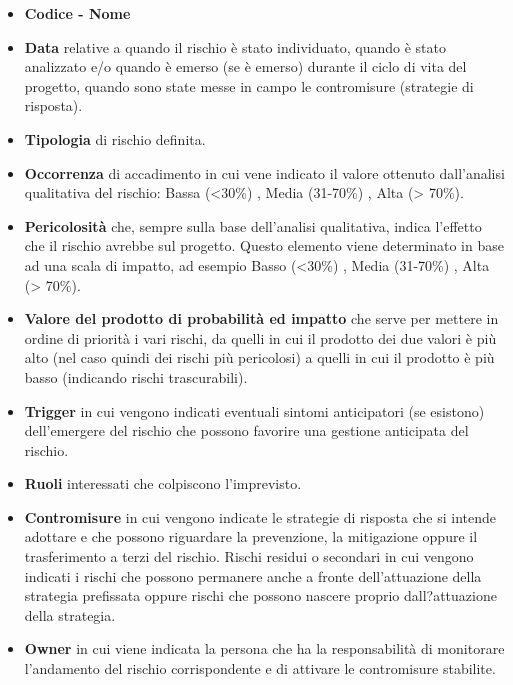 \documentclass[12pt,a4paper,titlepage]{article}
\begin{document}
		\begin{itemize}	
			\item \textbf{Codice - Nome}
			\item \textbf{Data} relative a quando il rischio è stato individuato, quando è stato analizzato e/o quando è emerso (se è emerso) durante il ciclo di vita del progetto, quando sono state messe in campo le contromisure (strategie di risposta).
			\item \textbf{Tipologia} di rischio definita.
			\item \textbf{Occorrenza} di accadimento in cui vene indicato il valore ottenuto dall'analisi qualitativa del rischio: Bassa (<30\%) , Media (31-70\%) , Alta (> 70\%).
			\item \textbf{Pericolosità} che, sempre sulla base dell'analisi qualitativa, indica l'effetto che il rischio avrebbe sul progetto. Questo elemento viene determinato in base ad una scala di impatto, ad esempio Basso (<30\%) , Media (31-70\%) , Alta (> 70\%).
			\item \textbf{Valore del prodotto di probabilità ed impatto} che serve per mettere in ordine di priorità i vari rischi, da quelli in cui il prodotto dei due valori è più alto (nel caso quindi dei rischi più pericolosi) a quelli in cui il prodotto è più basso (indicando rischi trascurabili).
			\item \textbf{Trigger} in cui vengono indicati eventuali sintomi anticipatori (se esistono) dell'emergere del rischio che possono favorire una gestione anticipata del rischio.
			\item \textbf{Ruoli} interessati che colpiscono l'imprevisto.
			\item \textbf{Contromisure} in cui vengono indicate le strategie di risposta che si intende adottare e che possono riguardare la prevenzione, la mitigazione oppure il trasferimento a terzi del rischio.
			Rischi residui o secondari in cui vengono indicati i rischi che possono permanere anche a fronte dell'attuazione della strategia prefissata oppure rischi che possono nascere proprio dall?attuazione della strategia.
			\item \textbf{Owner} in cui viene indicata la persona che ha la responsabilità di monitorare l'andamento del rischio corrispondente e di attivare le contromisure stabilite.
		\end{itemize}
	
\end{document}
